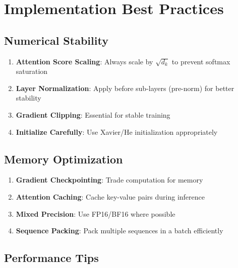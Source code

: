 
\section{Implementation Best Practices}

\subsection{Numerical Stability}

\begin{enumerate}
    \item \textbf{Attention Score Scaling}: Always scale by $\sqrt{d_k}$ to prevent softmax saturation
    \item \textbf{Layer Normalization}: Apply before sub-layers (pre-norm) for better stability
    \item \textbf{Gradient Clipping}: Essential for stable training
    \item \textbf{Initialize Carefully}: Use Xavier/He initialization appropriately
\end{enumerate}

\subsection{Memory Optimization}

\begin{enumerate}
    \item \textbf{Gradient Checkpointing}: Trade computation for memory
    \item \textbf{Attention Caching}: Cache key-value pairs during inference
    \item \textbf{Mixed Precision}: Use FP16/BF16 where possible
    \item \textbf{Sequence Packing}: Pack multiple sequences in a batch efficiently
\end{enumerate}

\subsection{Performance Tips}

